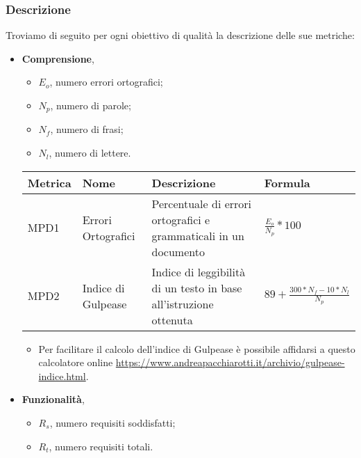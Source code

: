    \subsubsection{Descrizione}
   Troviamo di seguito per ogni obiettivo di qualità la descrizione delle sue metriche:
    \begin{itemize}
        \item \textbf{Comprensione},
            \begin{itemize}
                \item $E_o$, numero errori ortografici;
                \item $N_p$, numero di parole;
                \item $N_f$, numero di frasi;
                \item $N_l$, numero di lettere.
            \end{itemize}
            \begin{center}
                \begin{tabular}{|p{2cm}|p{3.5cm}|p{5.5cm}|p{3cm}|} \hline
                  \textbf{Metrica} & \textbf{Nome} & \textbf{Descrizione} & \textbf{Formula}    \\ \hline
                    MPD1 & Errori Ortografici    & Percentuale di errori ortografici e grammaticali in un documento      & $\frac{E_o}{N_p}*100$        \\ \hline
                    MPD2 & Indice di Gulpease    & Indice di leggibilità di un testo in base all'istruzione ottenuta   & $89+\frac{300*N_f-10*N_l}{N_p}$     \\ \hline
                \end{tabular}
            \end{center}
            \begin{itemize}
                \item Per facilitare il calcolo dell'indice di Gulpease è possibile affidarsi a questo calcolatore online \url{https://www.andreapacchiarotti.it/archivio/gulpease-indice.html}.
            \end{itemize}
        \item \textbf{Funzionalità},
            \begin{itemize}
                \item $R_s$, numero requisiti soddisfatti;
                \item $R_t$, numero requisiti totali.
            \end{itemize}
            \begin{center}

\end{center}
\end{itemize}
